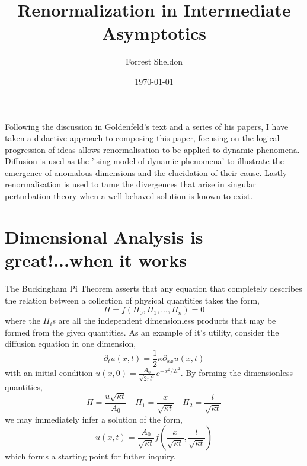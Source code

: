 

\title{Renormalization in Intermediate Asymptotics}
\author{Forrest Sheldon}
\date{\today}

\maketitle

Following the discussion in Goldenfeld's text and a series of his papers, I have taken a
didactive approach to composing this paper, focusing on the logical progression of ideas 
allows renormalisation to be applied to dynamic phenomena.  Diffusion is used as the
'ising model of dynamic phenomena' to illustrate the emergence of anomalous dimensions and
the elucidation of their cause. Lastly renormalisation is used to tame the divergences
that arise in singular perturbation theory when a well behaved solution is known to exist.

\section{Dimensional Analysis is great!...when it works}

The Buckingham Pi Theorem \cite{Buckingham1914} asserts that any equation
that completely describes
the relation between a collection of physical quantities takes the form,
\[\Pi = f( \Pi_0, \Pi_1, ...,\Pi_n) = 0\]
where the $\Pi_i$s are all the independent dimensionless products that may be
formed from the given quantities.  As an example of it's utility, consider the
diffusion equation in one dimension,
\[\partial_t u(x, t) = \frac{1}{2} \kappa \partial_{xx} u(x, t)\]
with an initial condition $u(x, 0) = \frac{A_0}{\sqrt{2\pi l^2}} e^{-x^2 / 2l^2}$.
By forming the dimensionless quantities,
\[\Pi = \frac{u \sqrt{\kappa t}}{A_0}\quad \Pi_1 = \frac{x}{\sqrt{\kappa t}} \quad
\Pi_2 = \frac{l}{\sqrt{\kappa t}} \]
we may immediately infer a solution of the form,
\[u(x, t)  = \frac{A_0}{\sqrt{\kappa t}} f\left(\frac{x}{\sqrt{\kappa t}}, \frac{l}{\sqrt{\kappa t}}\right) \]
which forms a starting point for futher inquiry.

